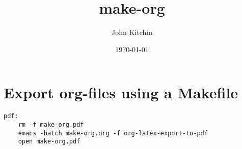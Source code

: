 \documentclass[11pt]{article}
\author{John Kitchin}
\date{\today}
\title{make-org}
\begin{document}
\maketitle
\tableofcontents

\section{Export org-files using a Makefile}
\label{sec-1}

\begin{verbatim}
pdf:
	rm -f make-org.pdf
	emacs -batch make-org.org -f org-latex-export-to-pdf
	open make-org.pdf
\end{verbatim}
\end{document}

